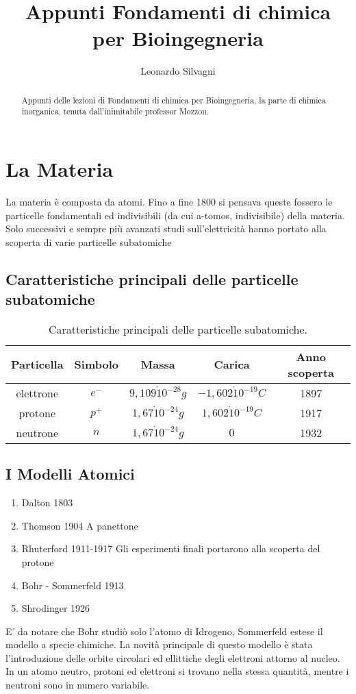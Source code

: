\documentclass{article}
\title{Appunti Fondamenti di chimica per Bioingegneria}
\author{Leonardo Silvagni}
\begin{document}
\maketitle

\begin{abstract}
Appunti delle lezioni di Fondamenti di chimica per Bioingegneria, la parte di chimica
inorganica, tenuta dall'inimitabile professor Mozzon. 
\end{abstract}

\section{La Materia}
La materia è composta da atomi. Fino a fine 1800 si pensava queste fossero le particelle fondamentali ed indivisibili (da cui a-tomos, indivisibile) della materia.  
Solo successivi e sempre più avanzati studi sull'elettricità hanno portato alla scoperta di varie particelle subatomiche
\subsection{Caratteristiche principali delle particelle subatomiche}

\begin{table}[H]
\centering
\begin{tabular}{c|c|c|c|c}
Particella & Simbolo & Massa & Carica & Anno scoperta \\\hline
elettrone & $e^-$ & $9,109\dot 10^{-28}g$ & $-1,602\dot 10^{-19}C$ & 1897 \\
protone & $p^+$ & $1,67\dot 10^{-24}g$ & $1,602\dot 10^{-19}C$ & 1917 \\
neutrone & $n$ & $1,67\dot 10^{-24}g$ & $0$ & 1932 
\end{tabular}
\caption{\label{tab:widgets}Caratteristiche principali delle particelle subatomiche.}
\end{table}
\subsection{I Modelli Atomici}
\begin{enumerate}
\item Dalton    1803
\item Thomson   1904 A panettone
\item Rhuterford    1911-1917 Gli esperimenti finali portarono alla scoperta del protone
\item Bohr - Sommerfeld     1913
\item Shrodinger    1926
\end{enumerate}
E' da notare che Bohr studiò solo l'atomo di Idrogeno, Sommerfeld estese il modello a specie chimiche. La novità principale di questo modello è stata l'introduzione delle orbite circolari ed ellittiche degli elettroni attorno al nucleo. 
In un atomo neutro, protoni ed elettroni si trovano nella stessa quantità, mentre i neutroni sono in numero variabile.
\end{document}

